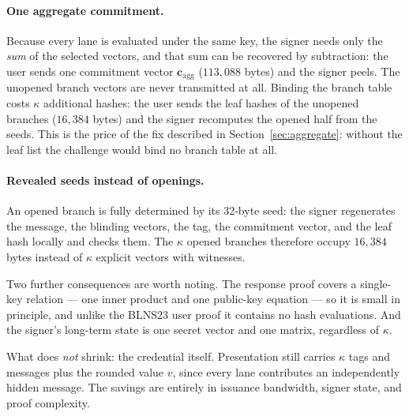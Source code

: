 \documentclass[11pt]{article}
\begin{document}
\paragraph{One aggregate commitment.}  Because every lane is evaluated under
the same key, the signer needs only the \emph{sum} of the selected vectors,
and that sum can be recovered by subtraction: the user sends one commitment
vector $\mathbf c_{\mathrm{agg}}$ ($113{,}088$ bytes) and the signer peels.
The unopened branch vectors are never transmitted at all.  Binding the branch
table costs $\kappa$ additional hashes: the user sends the leaf hashes of the
unopened branches ($16{,}384$ bytes) and the signer recomputes the opened
half from the seeds.  This is the price of the fix described in
Section~\ref{sec:aggregate}: without the leaf list the challenge would bind
no branch table at all.

\paragraph{Revealed seeds instead of openings.}  An opened branch is fully
determined by its 32-byte seed: the signer regenerates the message, the
blinding vectors, the tag, the commitment vector, and the leaf hash locally
and checks them.  The $\kappa$ opened branches therefore occupy $16{,}384$
bytes instead of $\kappa$ explicit vectors with witnesses.

Two further consequences are worth noting.  The response proof covers a
single-key relation --- one inner product and one public-key equation ---
so it is small in principle, and unlike the BLNS23 user proof it contains no
hash evaluations.  And the
signer's long-term state is one secret vector and one matrix, regardless of
$\kappa$.

What does \emph{not} shrink: the credential itself.  Presentation still
carries $\kappa$ tags and messages plus the rounded value $v$, since every
lane contributes an independently hidden message.  The savings are entirely in
issuance bandwidth, signer state, and proof complexity.
\end{document}
